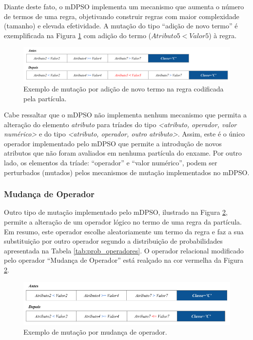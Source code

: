 \documentclass[
	12pt,				%
	openany,			%
	oneside,	
	a4paper,			%
	brazil,				%
	]{unimontes-ppgmsc-abntex2}
\begin{document}
Diante deste fato, o mDPSO implementa um mecanismo que aumenta o número de termos de uma regra, objetivando construir regras com maior complexidade (tamanho) e elevada efetividade.  A mutação do tipo ``adição de novo termo'' é exemplificada na Figura \ref{fig:mut_1} com adição do termo ($Atributo5 < Valor5$) à regra. 

\begin{figure}[ht]
\centering
\includegraphics[scale=.5]{img/mut_1}
\caption{Exemplo de mutação por adição de novo termo na regra codificada pela partícula.}
\label{fig:mut_1}
\end{figure}

Cabe ressaltar que o mDPSO não implementa nenhum mecanismo que permita a alteração do elemento {\em atributo} para tríades do tipo \textit{<atributo, operador, valor numérico>} e do tipo \textit{<atributo, operador, outro atributo>}. Assim, este é o único operador implementado pelo mDPSO que permite a introdução de novos atributos que não foram avaliados em nenhuma partícula do enxame. Por outro lado, os elementos da tríade: ``operador'' e ``valor numérico'', podem ser perturbados (mutados) pelos mecanismos de mutação implementados no mDPSO.

\subsubsection{Mudança de Operador}
\label{sec:mdpso_mut2} 

Outro tipo de mutação implementado pelo mDPSO, ilustrado na Figura \ref{fig:mut_2}, permite a alteração de um operador lógico no termo de uma regra da partícula. Em resumo, este operador escolhe aleatoriamente um termo da regra e faz a sua substituição por outro operador segundo a distribuição de probabilidades apresentada na Tabela \ref{tab:prob_operadores}. O operador relacional modificado pelo operador ``Mudança de Operador'' está realçado na cor vermelha da Figura \ref{fig:mut_2}.

\begin{figure}[ht]
\centering
\includegraphics[scale=.5]{img/mut_2}
\caption{Exemplo de mutação por mudança de operador.}
\label{fig:mut_2}
\end{figure}
\end{document}
